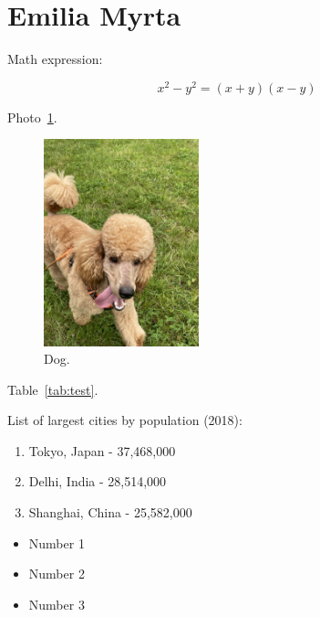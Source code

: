 \section{Emilia Myrta}

Math expression:

\[x^2 - y^2 = (x + y)(x - y)\]

Photo~\ref{fig:dog}.

\begin{figure}[htbp]
    \centering
    \includegraphics[width=0.4\textwidth]{Pictures/zdjecie_emilia.jpg}
    \caption{Dog.}
    \label{fig:dog}
\end{figure}

Table~\ref{tab:test}.



List of largest cities by population (2018):
\begin{enumerate}
  \item Tokyo, Japan - 37,468,000 
  \item Delhi, India - 28,514,000 
  \item Shanghai, China	- 25,582,000 	
\end{enumerate}

\begin{itemize}
  \item Number 1
  \item Number 2
  \item Number 3
\end{itemize}

